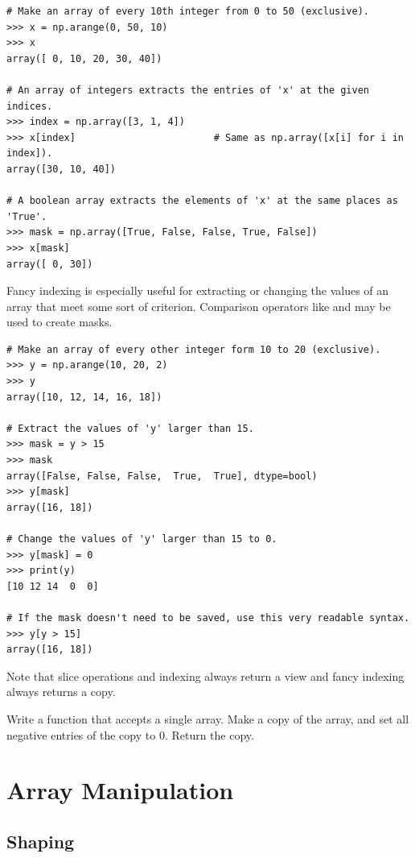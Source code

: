 \begin{lstlisting}
# Make an array of every 10th integer from 0 to 50 (exclusive).
>>> x = np.arange(0, 50, 10)
>>> x
array([ 0, 10, 20, 30, 40])

# An array of integers extracts the entries of 'x' at the given indices.
>>> index = np.array([3, 1, 4])
>>> x[index]                        # Same as np.array([x[i] for i in index]).
array([30, 10, 40])

# A boolean array extracts the elements of 'x' at the same places as 'True'.
>>> mask = np.array([True, False, False, True, False])
>>> x[mask]
array([ 0, 30])
\end{lstlisting}

Fancy indexing is especially useful for extracting or changing the values of an array that meet some sort of criterion.
Comparison operators like \li{<} and \li{==} may be used to create masks.

\begin{lstlisting}
# Make an array of every other integer form 10 to 20 (exclusive).
>>> y = np.arange(10, 20, 2)
>>> y
array([10, 12, 14, 16, 18])

# Extract the values of 'y' larger than 15.
>>> mask = y > 15
>>> mask
array([False, False, False,  True,  True], dtype=bool)
>>> y[mask]
array([16, 18])

# Change the values of 'y' larger than 15 to 0.
>>> y[mask] = 0
>>> print(y)
[10 12 14  0  0]

# If the mask doesn't need to be saved, use this very readable syntax.
>>> y[y > 15]
array([16, 18])
\end{lstlisting}

Note that slice operations and indexing always return a view and fancy indexing always returns a copy.

\begin{problem} %
Write a function that accepts a single array.
Make a copy of the array, and set all negative entries of the copy to $0$.
Return the copy.
\end{problem}

\section*{Array Manipulation} %

\subsection*{Shaping} %


